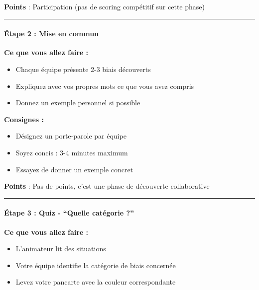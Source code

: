 \documentclass[
]{article}
\providecommand{\tightlist}{%
  \setlength{\itemsep}{0pt}\setlength{\parskip}{0pt}}
\begin{document}
\textbf{Points} : Participation (pas de scoring compétitif sur cette
phase)

\begin{center}\rule{0.5\linewidth}{0.5pt}\end{center}

\paragraph{\texorpdfstring{\textbf{Étape 2 : Mise en
commun}}{Étape 2 : Mise en commun}}\label{uxe9tape-2-mise-en-commun}

\textbf{Ce que vous allez faire :}

\begin{itemize}
\tightlist
\item
  Chaque équipe présente 2-3 biais découverts
\item
  Expliquez avec vos propres mots ce que vous avez compris
\item
  Donnez un exemple personnel si possible
\end{itemize}

\textbf{Consignes :}

\begin{itemize}
\tightlist
\item
  Désignez un porte-parole par équipe
\item
  Soyez concis : 3-4 minutes maximum
\item
  Essayez de donner un exemple concret
\end{itemize}

\textbf{Points} : Pas de points, c'est une phase de découverte
collaborative

\begin{center}\rule{0.5\linewidth}{0.5pt}\end{center}

\paragraph{\texorpdfstring{\textbf{Étape 3 : Quiz - ``Quelle catégorie
?''}}{Étape 3 : Quiz - ``Quelle catégorie ?''}}\label{uxe9tape-3-quiz---quelle-catuxe9gorie}

\textbf{Ce que vous allez faire :}

\begin{itemize}
\tightlist
\item
  L'animateur lit des situations
\item
  Votre équipe identifie la catégorie de biais concernée
\item
  Levez votre pancarte avec la couleur correspondante
\end{itemize}
\end{document}
